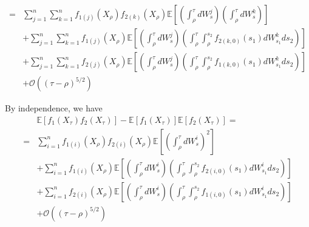 \documentclass[12pt]{article}
\begin{document}
\begin{equation}
\begin{aligned}
 =  &  \sum_{j=1}^n \sum_{k=1}^n f_{1(j)}(X_\rho) f_{2(k)}(X_\rho) \mathbb{E} \left[ \left(\int_\rho^\tau dW_s^j \right)  \left(\int_\rho^\tau dW_s^k \right) \right] \\
 & + \sum_{j=1}^n \sum_{k=1}^n f_{1(j)}(X_\rho) \mathbb{E} \left[ \left(\int_\rho^\tau dW_s^j \right)  \left(\int_\rho^\tau \int_{\rho}^{s_2} f_{2(k,0)}(s_1) dW_{s_1}^k ds_2 \right) \right] \\ 
 & + \sum_{j=1}^n \sum_{k=1}^n f_{2(j)}(X_\rho) \mathbb{E} \left[ \left(\int_\rho^\tau dW_s^j \right)  \left(\int_\rho^\tau \int_{\rho}^{s_2} f_{1(k,0)}(s_1) dW_{s_1}^k ds_2 \right) \right] \\
& + \mathcal{O} ((\tau - \rho)^{5/2})
 \end{aligned}
\end{equation}

By independence, we have
\begin{equation}
\begin{aligned}
& \mathbb{E} [f_1(X_\tau) f_2(X_\tau) ] - \mathbb{E}[f_1(X_\tau)]\mathbb{E}[f_2(X_\tau)]= \\
=  &  \sum_{i=1}^n  f_{1(i)}(X_\rho) f_{2(i)}(X_\rho) \mathbb{E} \left[ \left(\int_\rho^\tau dW_s^i \right)^2  \right] \\
 & + \sum_{i=1}^n f_{1(i)}(X_\rho) \mathbb{E} \left[ \left(\int_\rho^\tau dW_s^i \right)  \left(\int_\rho^\tau \int_{\rho}^{s_2} f_{2(i,0)}(s_1) dW_{s_1}^i ds_2 \right) \right] \\ 
 & + \sum_{i=1}^n  f_{2(i)}(X_\rho) \mathbb{E} \left[ \left(\int_\rho^\tau dW_s^i \right)  \left(\int_\rho^\tau \int_{\rho}^{s_2} f_{1(i,0)}(s_1) dW_{s_1}^i ds_2 \right) \right] \\
& + \mathcal{O} ((\tau - \rho)^{5/2})
 \end{aligned}
\end{equation}
\end{document}
